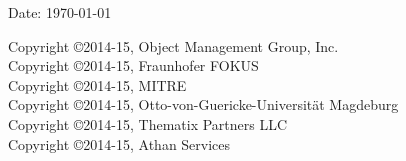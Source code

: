 \documentclass[10pt,fleqn,final]{scrreprt}
\begin{document}
\nocite{OM2014,JYB-Festschrift2015-DOL,womo13,DOL-TKE2012,DOL-3semantics,blendingc3gi12,hyper2010}



\pagestyle{headings}  %

\begin{flushright}
Date: \today
\end{flushright}

\thispagestyle{empty}
\clearpage

		

\noindent Copyright \copyright 2014-15, Object Management Group, Inc.\\
Copyright \copyright 2014-15, Fraunhofer FOKUS\\
Copyright \copyright 2014-15, MITRE\\
Copyright \copyright 2014-15, Otto-von-Guericke-Universit{\"a}t Magdeburg  \\
Copyright \copyright 2014-15, Thematix Partners LLC \\
Copyright \copyright 2014-15, Athan Services \\
\end{document}
